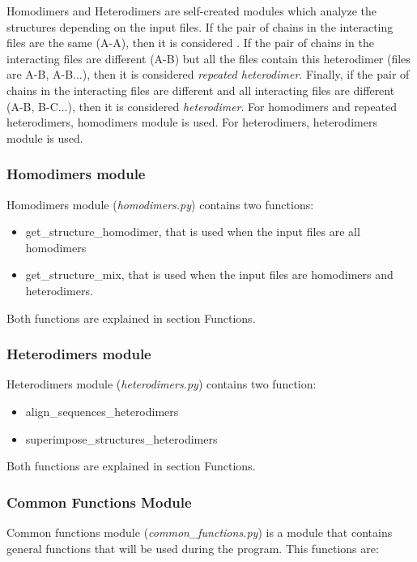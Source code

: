 \documentclass[a4paper,10pt]{report}
\begin{document}
Homodimers and Heterodimers are self-created modules which analyze the structures depending on the input files. If the pair of chains in the interacting files are the same (A-A), then it is considered . If the pair of chains in the interacting files are different (A-B) but all the files contain this heterodimer (files are A-B, A-B...), then it is considered \textit{repeated heterodimer}. Finally, if the pair of chains in the interacting files are different and all interacting files are different (A-B, B-C...), then it is considered \textit{heterodimer}. For homodimers and repeated heterodimers, homodimers module is used. For heterodimers, heterodimers module is used.

\subsubsection{Homodimers module}

Homodimers module (\textit{homodimers.py}) contains two functions:

\begin{itemize}
 \item get\_structure\_homodimer, that is used when the input files are all homodimers
 \item get\_structure\_mix, that is used when the input files are homodimers and heterodimers.
\end{itemize}

\noindent
Both functions are explained in section Functions.

\subsubsection{Heterodimers module}

Heterodimers module (\textit{heterodimers.py}) contains two function:

\begin{itemize}
 \item align\_sequences\_heterodimers
 \item superimpose\_structures\_heterodimers
\end{itemize}

\noindent
Both functions are explained in section Functions.

\subsubsection{Common Functions Module}

Common functions module (\textit{common\_functions.py}) is a module that contains general functions that will be used during the program. This functions are:
\end{document}
